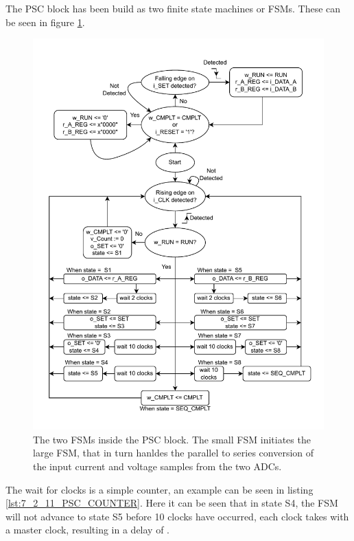 The PSC block has been build as two finite state machines or FSMs. These can be seen in figure \ref{fig_7_2_11_PSC_FSM}.
\begin{figure}[H]
    \centering
    \includegraphics[clip, trim=0 0 0 0, width=1\textwidth]{Sections/7_SystemDesign/Figures/PSC_FSM20.pdf}
    \caption{The two FSMs inside the PSC block. The small FSM initiates the large FSM, that in turn hanldes the parallel to series conversion of the input current and voltage samples from the two ADCs.}
    \label{fig_7_2_11_PSC_FSM}
\end{figure}
The wait for clocks is a simple counter, an example can be seen in listing \ref{lst:7_2_11_PSC_COUNTER}. Here it can be seen that in state S4, the FSM will not advance to state S5 before 10 clocks have occurred, each clock takes  with a  master clock, resulting in a delay of .



